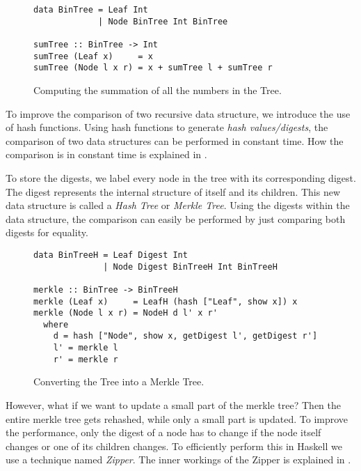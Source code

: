 \begin{figure}[H]
\captionsetup{justification=justified,singlelinecheck=false,margin=0cm}
\begin{verbatim}
data BinTree = Leaf Int
             | Node BinTree Int BinTree

sumTree :: BinTree -> Int
sumTree (Leaf x)     = x
sumTree (Node l x r) = x + sumTree l + sumTree r
\end{verbatim}
\caption{Computing the summation of all the numbers in the Tree.}
\label{fig-bin-tree}
\end{figure}

To improve the comparison of two recursive data structure, we introduce the use of hash functions. Using hash functions to generate \textit{hash values/digests}, the comparison of two data structures can be performed in constant time. How the comparison is in constant time is explained in .

To store the digests, we label every node in the tree with its corresponding digest. The digest represents the internal structure of itself and its children. This new data structure is called a \textit{Hash Tree} or \textit{Merkle Tree}\cite{merkle1987digital}. Using the digests within the data structure, the comparison can easily be performed by just comparing both digests for equality.

\begin{figure}[H]
\captionsetup{justification=justified,singlelinecheck=false,margin=0cm}
\begin{verbatim}
data BinTreeH = Leaf Digest Int
              | Node Digest BinTreeH Int BinTreeH

merkle :: BinTree -> BinTreeH
merkle (Leaf x)     = LeafH (hash ["Leaf", show x]) x
merkle (Node l x r) = NodeH d l' x r'
  where
    d = hash ["Node", show x, getDigest l', getDigest r']
    l' = merkle l
    r' = merkle r
\end{verbatim}
\caption{Converting the Tree into a Merkle Tree.}
\label{fig-conv-tree}
\end{figure}

However, what if we want to update a small part of the merkle tree? Then the entire merkle tree gets rehashed, while only a small part is updated. To improve the performance, only the digest of a node has to change if the node itself changes or one of its children changes. To efficiently perform this in Haskell we use a technique named \textit{Zipper}\cite{huet1997zipper}. The inner workings of the Zipper is explained in .

